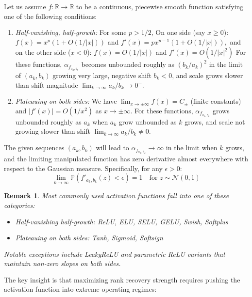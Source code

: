 \documentclass{article}
\newtheorem{remark}{Remark}[section]
\numberwithin{figure}{section}
\begin{document}
Let us assume $f:\mathbb{R}\to\mathbb{R}$ to be a continuous, piecewise smooth function satisfying one of the following conditions:
\begin{enumerate}
    \item \emph{Half-vanishing, half-growth:} For some $p > 1/2$, On one side (say $x \geq 0$): $f(x) = x^p(1 + O(1/|x|))$ and $f'(x) = px^{p-1} (1+O(1/|x|)),$ and on the other side ($x < 0$): $f(x) = O(1/|x|)$ and $f'(x) = O(1/|x|^2)$
    For these functions, $\alpha_{f_{a_k,b_k}}$ becomes unbounded roughly as $(b_k/a_k)^2$ in the limit of $(a_k,b_k) $ growing very large, negative shift $b_k < 0$, and scale grows slower than shift magnitude $\lim_{k\to\infty} a_k/b_k \to 0^-$. 
    
    \item \emph{Plateauing on both sides:} We have $\lim_{x \to \pm\infty} f(x) = C_{\pm}$ (finite constants) and $|f'(x)| = O(1/x^2)$ as $x \to \pm\infty.$
    For these functions, $\alpha_{f_{a_k,b_k}}$ grows unbounded roughly as $a_k$ when $a_k$ grow unbounded as $k$ grows, and scale not growing slower than shift $\lim_{k\to\infty} a_k/b_k \neq 0 .$
\end{enumerate}

The given sequences $(a_k, b_k)$  will lead to $\alpha_{f_{a_k,b_k}} \to \infty$ in the limit when $k$ grows, and the limiting manipulated function has zero derivative almost everywhere with respect to the Gaussian measure. Specifically, for any $\epsilon > 0$:
$$\lim_{k \to \infty} \mathbb{P}(f'_{a_k,b_k}(z) < \epsilon) = 1 \quad \text{for } z \sim \mathcal{N}(0,1)$$

\begin{remark}
Most commonly used activation functions fall into one of these categories:
\begin{itemize}
    \item \emph{Half-vanishing half-growth:} ReLU, ELU, SELU, GELU, Swish, Softplus
    \item \emph{Plateauing on both sides:} Tanh, Sigmoid, Softsign
\end{itemize}
Notable exceptions include LeakyReLU and parametric ReLU variants that maintain non-zero slopes on both sides.
\end{remark}



The key insight is that maximizing rank recovery strength requires pushing the activation function into extreme operating regimes:
\end{document}
